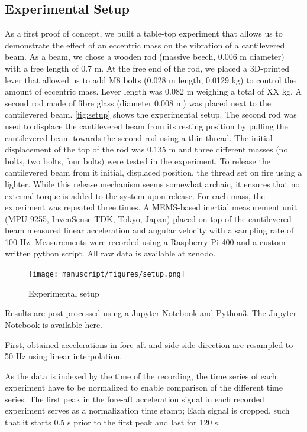 \documentclass{article}
\begin{document}
\subsection{Experimental Setup}

As a first proof of concept, we built a table-top experiment that allows us to demonstrate the effect of an eccentric mass on the vibration of a cantilevered beam. As a beam, we chose a wooden rod (massive beech, 0.006 m diameter) with a free length of 0.7 m. At the free end of the rod, we placed a 3D-printed lever that allowed us to add M8 bolts (0.028 m length, 0.0129 kg) to control the amount of eccentric mass. Lever length was 0.082 m weighing a total of XX kg. A second rod made of fibre glass (diameter 0.008 m) was placed next to the cantilevered beam. \autoref{fig:setup} shows the experimental setup. The second rod was used to displace the cantilevered beam from its resting position  by pulling the cantilevered beam towards the second rod using a thin thread. The initial displacement of the top of the rod was 0.135 m and three different masses (no bolts, two bolts, four bolts) were tested in the experiment. To release the cantilevered beam from it initial, displaced position, the thread set on fire using a lighter. While this release mechanism seems somewhat archaic, it ensures that no external torque is added to the system upon release. For each mass, the experiment was repeated three times. A MEMS-based inertial measurement unit (MPU 9255, InvenSense TDK, Tokyo, Japan) placed on top of the cantilevered beam measured linear acceleration and angular velocity with a sampling rate of 100 Hz. Measurements were recorded using a Raspberry Pi 400 and a custom written python script. All raw data is available at zenodo. 

\begin{figure}[ht!]
    \centering
    \texttt{[image: manuscript/figures/setup.png]}
    \caption{Experimental setup}
    \label{fig:setup}
\end{figure}

Results are post-processed using a Jupyter Notebook and Python3. The Jupyter Notebook is available here. 

First, obtained accelerations in fore-aft and side-side direction are resampled to 50 Hz using linear interpolation. 

As the data is indexed by the time of the recording, the time series of each experiment have to be normalized to enable comparison of the different time series. The first peak in the fore-aft acceleration signal in each recorded experiment serves as a normalization time stamp; Each signal is cropped, such that it starts 0.5 s prior to the first peak and last for 120 s. 
\end{document}
